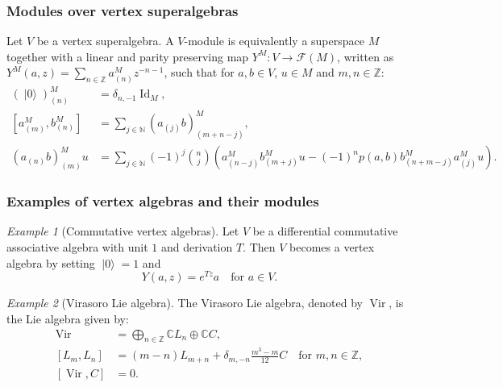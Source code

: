 \documentclass[notheorems]{beamer}
\theoremstyle{remark}
\newtheorem{example}{Example}
\DeclareMathOperator{\Vir}{Vir}
\DeclareMathOperator{\Id}{Id}
\DeclareMathOperator{\vac}{|0\rangle}
\begin{document}
\begin{frame}
  \frametitle{Modules over vertex superalgebras}
  Let $V$ be a vertex superalgebra.
  A $V$-module is equivalently a superspace $M$ together with a linear and parity preserving map $Y^M: V \to \mathcal{F}(M)$, written as $Y^M(a, z) = \sum_{n \in \mathbb{Z}}a^M_{(n)}z^{-n - 1}$, such that for $a, b \in V$, $u \in M$ and $m, n \in \mathbb{Z}$:
  \begin{align}
    \label{eq:4}
    (\vac)^M_{(n)} &= \delta_{n, -1}\Id_M, \\
    \label{eq:5}
    [a^M_{(m)}, b^M_{(n)}] &= \sum_{j \in \mathbb{N}}(a_{(j)}b)^M_{(m + n - j)}, \\
    \label{eq:6}
    (a_{(n)}b)^M_{(m)}u &= \sum_{j \in \mathbb{N}}(-1)^j\binom{n}{j}(a^M_{(n - j)}b^M_{(m + j)}u - (-1)^np(a, b)b^M_{(n + m - j)}a^M_{(j)}u).
  \end{align}
\end{frame}

\begin{frame}
  \frametitle{Examples of vertex algebras and their modules}
  \begin{example}[Commutative vertex algebras]
    \label{exa:1}
    Let $V$ be a differential commutative associative algebra with unit $1$ and derivation $T$.
    Then $V$ becomes a vertex algebra by setting  $\vac = 1$ and
    \begin{equation*}
      Y(a, z) = e^{Tz}a \quad \text{for $a \in V$}.
    \end{equation*}
  \end{example}

  \begin{example}[Virasoro Lie algebra]
    \label{exa:2}
    The Virasoro Lie algebra, denoted by $\Vir$, is the Lie algebra given by:
    \begin{equation*}
      \begin{split}
        \Vir &= \bigoplus_{n \in \mathbb{Z}}\mathbb{C}L_{n} \oplus \mathbb{C}C, \\
        [L_m, L_n] &= (m - n)L_{m + n} + \delta_{m, -n}\frac{m^3 - m}{12}C \quad \text{for $m, n \in \mathbb{Z}$}, \\
        [\Vir, C] &= 0.
      \end{split}
    \end{equation*}
  \end{example}
\end{frame}
\end{document}
